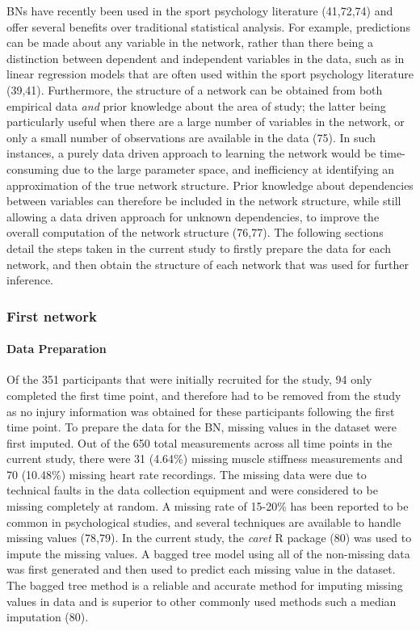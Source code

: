 \documentclass[
  english,
  man]{apa6}
\let\oldparagraph\paragraph
\renewcommand{\paragraph}[1]{\oldparagraph{#1}\mbox{}}
\begin{document}
BNs have recently been used in the sport psychology literature (41,72,74) and offer several benefits over traditional statistical analysis.
For example, predictions can be made about any variable in the network, rather than there being a distinction between dependent and independent variables in the data, such as in linear regression models that are often used within the sport psychology literature (39,41).
Furthermore, the structure of a network can be obtained from both empirical data \emph{and} prior knowledge about the area of study; the latter being particularly useful when there are a large number of variables in the network, or only a small number of observations are available in the data (75).
In such instances, a purely data driven approach to learning the network would be time-consuming due to the large parameter space, and inefficiency at identifying an approximation of the true network structure.
Prior knowledge about dependencies between variables can therefore be included in the network structure, while still allowing a data driven approach for unknown dependencies, to improve the overall computation of the network structure (76,77).
The following sections detail the steps taken in the current study to firstly prepare the data for each network, and then obtain the structure of each network that was used for further inference.

\hypertarget{first-network}{%
\subsubsection{First network}\label{first-network}}

\hypertarget{data-preparation}{%
\paragraph{Data Preparation}\label{data-preparation}}

Of the 351 participants that were initially recruited for the study, 94 only completed the first time point, and therefore had to be removed from the study as no injury information was obtained for these participants following the first time point.
To prepare the data for the BN, missing values in the dataset were first imputed.
Out of the 650 total measurements across all time points in the current study, there were 31 (4.64\%) missing muscle stiffness measurements and 70 (10.48\%) missing heart rate recordings.
The missing data were due to technical faults in the data collection equipment and were considered to be missing completely at random.
A missing rate of 15-20\% has been reported to be common in psychological studies, and several techniques are available to handle missing values (78,79).
In the current study, the \emph{caret} R package (80) was used to impute the missing values.
A bagged tree model using all of the non-missing data was first generated and then used to predict each missing value in the dataset.
The bagged tree method is a reliable and accurate method for imputing missing values in data and is superior to other commonly used methods such a median imputation (80).
\end{document}

